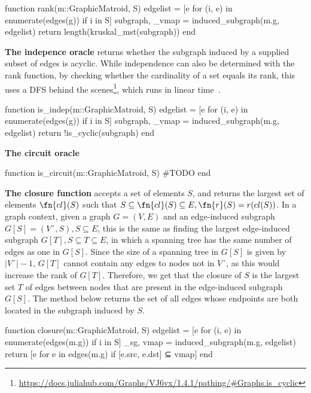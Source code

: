 \begin{jllisting}
function rank(m::GraphicMatroid, S)
  edgelist = [e for (i, e) in enumerate(edges(g)) if i in S]
  subgraph, _vmap = induced_subgraph(m.g, edgelist)
  return length(kruskal_mst(subgraph))
end
\end{jllisting}

\textbf{The indepence oracle} returns whether the subgraph induced by a supplied subset of edges is acyclic. While independence can also be determined with the rank function, by checking whether the cardinality of a set equals its rank, this uses a DFS behind the scenes\footnote{\href{https://docs.juliahub.com/Graphs/VJ6vx/1.4.1/pathing/\#Graphs.is\_cyclic}{https://docs.juliahub.com/Graphs/VJ6vx/1.4.1/pathing/\#Graphs.is\_cyclic}}, which runs in linear time~\cite{Cormen2009-zm}.

\begin{jllisting}
function is_indep(m::GraphicMatroid, S)
  edgelist = [e for (i, e) in enumerate(edges(g)) if i in S]
  subgraph, _vmap = induced_subgraph(m.g, edgelist)
  return !is_cyclic(subgraph)
end
\end{jllisting}

\textbf{The circuit oracle} \skelline
\begin{jllisting}
function is_circuit(m::GraphicMatroid, S)
  #TODO
end
\end{jllisting}

\textbf{The closure function} accepts a set of elements $S$, and returns the largest set of elements $\fn{cl}(S)$ such that $S \subseteq \fn{cl}(S) \subseteq E, \fn{r}(S) = r(cl(S))$. In a graph context, given a graph $G=(V,E)$ and an edge-induced subgraph $G[S] = (V´, S), S\subseteq E$, this is the same as finding the largest edge-induced subgraph $G[T], S\subseteq T\subseteq E$, in which a spanning tree has the same number of edges as one in $G[S]$. Since the size of a spanning tree in $G[S]$ is given by $|V´|-1$, $G[T]$ cannot contain any edges to nodes not in $V´$, as this would increase the rank of $G[T]$. Therefore, we get that the closure of $S$ is the largest set $T$ of edges between nodes that are present in the edge-induced subgraph $G[S]$. The method  below returns the set of all edges whose endpoints are both located in the subgraph induced by $S$.
\begin{jllisting}
function closure(m::GraphicMatroid, S)
  edgelist = [e for (i, e) in enumerate(edges(m.g)) if i in S]
  _sg, vmap = induced_subgraph(m.g, edgelist)
  return [e for e in edges(m.g) if [e.src, e.dst] ⊆ vmap]
end
\end{jllisting}


